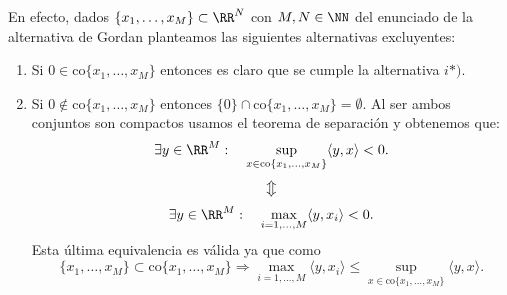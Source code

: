 En efecto, dados $ \{x_1,\dots, x_M \} \subset \RR^N $ con $ M, N \in \NN  $ del enunciado de la alternativa de Gordan planteamos las siguientes alternativas excluyentes:
\begin{enumerate}
\item Si $ 0 \in \mathrm{co}\{x_1,\dots, x_M \} $ entonces es claro que se cumple la alternativa $ i*) $.
\item Si $ 0 \notin \mathrm{co}\{x_1,\dots, x_M \} $ entonces $ \{0\} \cap \mathrm{co}\{x_1,\dots, x_M \} = \emptyset $. Al ser ambos conjuntos son compactos usamos el teorema de separación y obtenemos que:
\[
\exists y \in \RR^M: \quad \sup_{x \in \mathrm{co}\{x_1,\dots, x_M \}} \langle y, x \rangle < 0.
\]
\[
\big\Updownarrow
\]
\[
\exists y \in \RR^M: \quad \max_{i = 1,\dots, M} \langle y, x_i \rangle < 0.
\]
Esta última equivalencia es válida ya que como
\[ \{x_1,\dots, x_M \} \subset \mathrm{co}\{x_1,\dots, x_M \}  \Longrightarrow \max_{i = 1,\dots, M} \langle y, x_i \rangle \leq \sup_{x \in \mathrm{co}\{x_1,\dots, x_M \}} \langle y, x \rangle.
\]
\end{enumerate}
